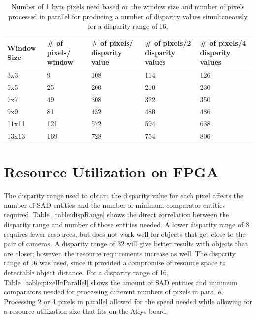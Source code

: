 \begin{table}
\begin{center}
	\begin{tabular}{| p{1.7cm} | p{2.5cm} | p{2.7cm} | p{2.7cm} | p{2.7cm} |}
		\hline
		\rowstyle{\bfseries} Window Size & 
		\rowstyle{\bfseries} \# of pixels/ window & 
		\rowstyle{\bfseries} \# of pixels/ disparity value &
		\rowstyle{\bfseries} \# of pixels/2 disparity values & 
		\rowstyle{\bfseries} \# of pixels/4 disparity values %
		\tabularnewline
		\hline
		3x3 & 9 & 108 & 114 & 126
		\tabularnewline
		\hline
		5x5 & 25 & 200 & 210 & 230
		\tabularnewline
		\hline
		\rowstyle{\bfseries} 7x7 & 
		\rowstyle{\bfseries} 49 & 
		\rowstyle{\bfseries} 308 & 
		\rowstyle{\bfseries} 322 & 
		\rowstyle{\bfseries} 350
		\tabularnewline
		\hline
		\rowstyle{\bfseries} 9x9 & 
		\rowstyle{\bfseries} 81 & 
		\rowstyle{\bfseries} 432 & 
		\rowstyle{\bfseries} 480 & 
		\rowstyle{\bfseries} 486
		\tabularnewline
		\hline
		11x11 & 121 & 572 & 594 & 638
		\tabularnewline
		\hline
		13x13 & 169 & 728 & 754 & 806		
 		\tabularnewline
		\hline 
	\end{tabular}
	\captionfonts
	\caption{Number of 1 byte pixels need based on the window size and number of pixels processed in parallel for producing a number of disparity values simultaneously for a disparity range of 16.}
	\label{table:pixelCount}
\end{center}
\end{table}

\section{Resource Utilization on FPGA}
\label{sec:utilize}

The disparity range used to obtain the disparity value for each pixel affects the number of SAD entities and the number of minimum comparator entities required. Table~\ref{table:dispRange} shows the direct correlation between the disparity range and number of those entities needed. A lower disparity range of 8 requires fewer resources, but does not work well for objects that get close to the pair of cameras. A disparity range of 32 will give better results with objects that are closer; however, the resource requirements increase as well. The disparity range of 16 was used, since it provided a compromise of resource space to detectable object distance. For a disparity range of 16, Table~\ref{table:pixelInParallel} shows the amount of SAD entities and minimum comparators needed for processing different numbers of pixels in parallel. Processing 2 or 4 pixels in parallel allowed for the speed needed while allowing for a resource utilization size that fits on the Atlys board.

